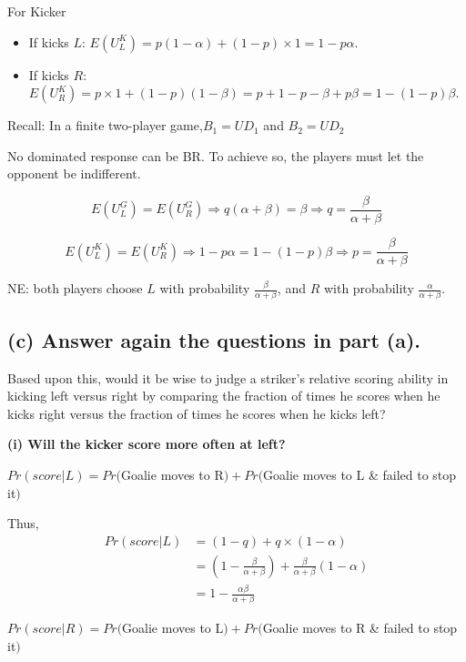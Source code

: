 \documentclass{article}
\begin{document}
For Kicker
\begin{itemize}
\item If kicks $L$: $E(U^K_L) = p (1-\alpha) + (1-p)\times 1 = 1 - p\alpha$.
\item If kicks $R$: $E(U^K_R) = p\times 1 + (1-p)(1-\beta) = p + 1 - p - \beta + p\beta = 1 - (1-p)\beta$.
\end{itemize}

\begin{mdframed}[backgroundcolor=blue!20,linecolor=white]
Recall: In a finite two-player game,$B_1 = UD_1$ and $B_2 = UD_2$

No dominated response can be BR. To achieve so, the players must let the opponent be indifferent.
\end{mdframed}


$$E(U^G_L) = E(U^G_R) \Rightarrow  q(\alpha+\beta) = \beta \Rightarrow q=\frac{\beta}{\alpha+\beta}$$
 
$$E(U^K_L) = E(U^K_R) \Rightarrow 1- p\alpha = 1-(1-p)\beta \Rightarrow p = \frac{\beta}{\alpha+\beta}$$

 
NE: both players choose $L$ with probability $\tfrac{\beta}{\alpha + \beta}$, and $R$ with probability $\tfrac{\alpha}{\alpha + \beta}$. 

   
\subsection*{(c) Answer again the questions in part (a).}

 Based upon this, would it be wise to judge a striker's relative scoring ability in kicking left versus right by comparing the fraction of times he scores when he kicks right versus the fraction of times he scores when he kicks left?

\medskip

\textbf{(i) Will the kicker score more often at left?}

$Pr(score|L) = Pr($Goalie moves to R$) + Pr($Goalie moves to L \&  failed to stop it$)$
\smallskip

Thus, 
\begin{align*}
Pr(score|L) &= (1-q) + q \times (1-\alpha) \\
&= (1-\tfrac{\beta}{\alpha + \beta}) + \tfrac{\beta}{\alpha + \beta} (1-\alpha) \\
&= 1- \tfrac{\alpha \beta }{\alpha + \beta} 
\end{align*}


$Pr(score|R) = Pr($Goalie moves to L$) + Pr($Goalie moves to R \&  failed to stop it$)$
\end{document}
